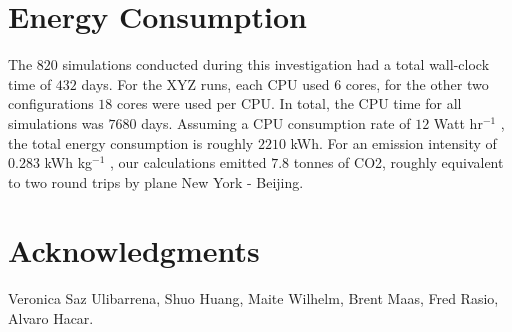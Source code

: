 \documentclass[submission,phys]{lib/SciPost}
\begin{document}
\section*{Energy Consumption}

The $820$ simulations conducted during this investigation had a total
wall-clock time of $432$ days. For the XYZ runs, each CPU used $6$
cores, for the other two configurations $18$ cores were used per
CPU. In total, the CPU time for all simulations was $7680$
days. Assuming a CPU consumption rate of $12$ Watt hr$^{-1}$
\cite{2020NatAs...4..819P}, the total energy consumption is roughly
$2210$ kWh. For an emission intensity of $0.283$ kWh kg$^{-1}$
\cite{doi:10.1002/cpe.3489}, our calculations emitted $7.8$ tonnes of
CO2, roughly equivalent to two round trips by plane New York -
Beijing.

\section*{Acknowledgments}
Veronica Saz Ulibarrena, Shuo Huang, Maite Wilhelm, Brent Maas,
Fred Rasio, Alvaro Hacar.


%
\end{document}

